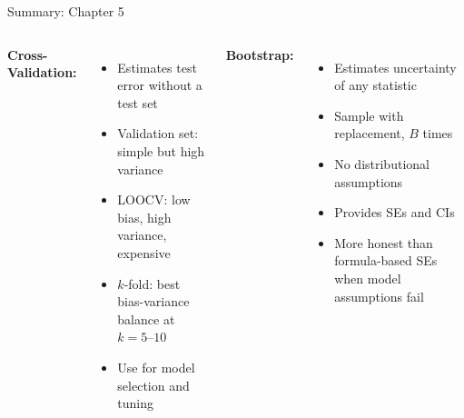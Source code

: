 \documentclass[aspectratio=169, 11pt]{beamer}
\begin{document}
\begin{frame}{Summary: Chapter 5}
\begin{columns}
\textbf{Cross-Validation:}
\begin{itemize}
  \item Estimates test error without a test set
  \item Validation set: simple but high variance
  \item LOOCV: low bias, high variance, expensive
  \item $k$-fold: best bias-variance balance at $k=5$--$10$
  \item Use for model selection and tuning
\end{itemize}

\textbf{Bootstrap:}
\begin{itemize}
  \item Estimates uncertainty of any statistic
  \item Sample with replacement, $B$ times
  \item No distributional assumptions
  \item Provides SEs and CIs
  \item More honest than formula-based SEs when model assumptions fail
\end{itemize}
\end{columns}

\vspace{0.5em}
\centering
{}
\end{frame}
\end{document}
